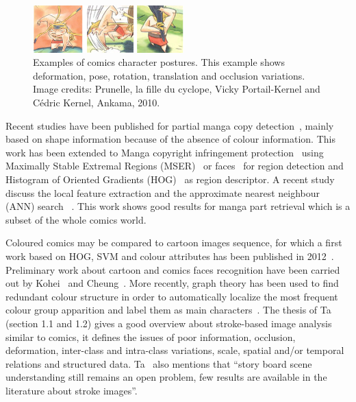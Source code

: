  \begin{figure}[!ht]	%
 	 \centering
 	\includegraphics[width=220px]{figs/prunelle.png}
 	\caption[Illustration of the diversity of comics character postures]{Examples of comics character postures. This example shows deformation, pose, rotation, translation and occlusion variations. Image credits: Prunelle, la fille du cyclope, Vicky Portail-Kernel and C\'{e}dric Kernel, Ankama, 2010.
}
 	\label{fig:sota:tarzan}
 \end{figure}

Recent studies have been published for partial manga copy detection~\cite{Sun2010}, mainly based on shape information because of the absence of colour information.
This work has been extended to Manga copyright infringement protection~\cite{Sun2009Detecting,Sun2013IJDAR} using Maximally Stable Extremal Regions (MSER)~\cite{matas2004robust} or faces~\cite{Viola2004robust} for region detection and Histogram of Oriented Gradients (HOG)~\cite{Dalal05} as region descriptor.
A recent study discuss the local feature extraction and the approximate nearest neighbour (ANN) search~\cite{Iwata2014StudyManga} .
This work shows good results for manga part retrieval which is a subset of the whole comics world.

Coloured comics may be compared to cartoon images sequence, for which a first work based on HOG, SVM and colour attributes has been published in 2012~\cite{Khan12}.
Preliminary work about cartoon and comics faces recognition have been carried out by Kohei~\cite{Kohei2012} and Cheung~\cite{cheung2008face}.
More recently, graph theory has been used to find redundant colour structure in order to automatically localize the most frequent colour group apparition and label them as main characters~\cite{HoGREC2013}.
The thesis of Ta~\cite{TAPhD2010} (section 1.1 and 1.2) gives a good overview about stroke-based image analysis similar to comics, it defines the issues of poor information, occlusion, deformation, inter-class and intra-class variations, scale, spatial and/or temporal relations and structured data.
Ta~\cite{TAPhD2010} also mentions that ``story board scene understanding still remains an open problem, few results are available in the literature about stroke images''.

